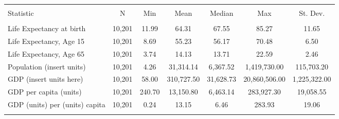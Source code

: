 
\begin{tabular}{@{\extracolsep{5pt}}lcccccc} 
\\[-1.8ex]\hline \\[-1.8ex] 
Statistic & \multicolumn{1}{c}{N} & \multicolumn{1}{c}{Min} & \multicolumn{1}{c}{Mean} & \multicolumn{1}{c}{Median} & \multicolumn{1}{c}{Max} & \multicolumn{1}{c}{St. Dev.} \\ 
\hline 
\hline \\[-1.8ex] 
Life Expectancy at birth & 10,201 & 11.99 & 64.31 & 67.55 & 85.27 & 11.65 \\ 
Life Expectancy, Age 15 & 10,201 & 8.69 & 55.23 & 56.17 & 70.48 & 6.50 \\ 
Life Expectancy, Age 65 & 10,201 & 3.74 & 14.13 & 13.71 & 22.59 & 2.46 \\ 
Population (insert units) & 10,201 & 4.26 & 31,314.14 & 6,367.52 & 1,419,730.00 & 115,703.20 \\ 
GDP (insert units here) & 10,201 & 58.00 & 310,727.50 & 31,628.73 & 20,860,506.00 & 1,225,322.00 \\ 
GDP per capita (units) & 10,201 & 240.70 & 13,150.80 & 6,463.14 & 283,927.30 & 19,058.55 \\ 
GDP (units) per (units) capita & 10,201 & 0.24 & 13.15 & 6.46 & 283.93 & 19.06 \\ 
\hline 
\hline \\[-1.8ex] 
\end{tabular} 

